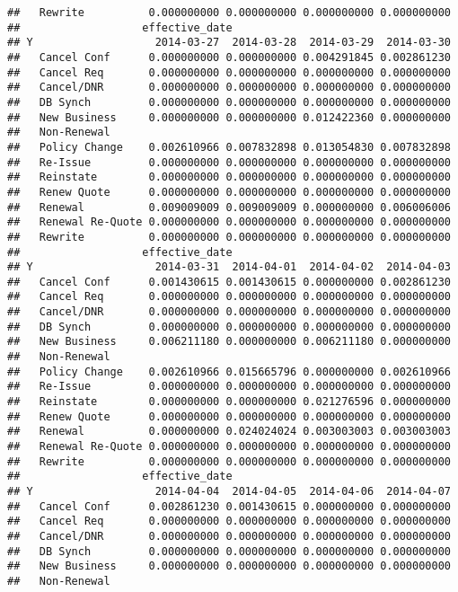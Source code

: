 \documentclass[]{article}
\begin{document}
\begin{verbatim}
##   Rewrite          0.000000000 0.000000000 0.000000000 0.000000000
##                   effective_date
## Y                   2014-03-27  2014-03-28  2014-03-29  2014-03-30
##   Cancel Conf      0.000000000 0.000000000 0.004291845 0.002861230
##   Cancel Req       0.000000000 0.000000000 0.000000000 0.000000000
##   Cancel/DNR       0.000000000 0.000000000 0.000000000 0.000000000
##   DB Synch         0.000000000 0.000000000 0.000000000 0.000000000
##   New Business     0.000000000 0.000000000 0.012422360 0.000000000
##   Non-Renewal                                                     
##   Policy Change    0.002610966 0.007832898 0.013054830 0.007832898
##   Re-Issue         0.000000000 0.000000000 0.000000000 0.000000000
##   Reinstate        0.000000000 0.000000000 0.000000000 0.000000000
##   Renew Quote      0.000000000 0.000000000 0.000000000 0.000000000
##   Renewal          0.009009009 0.009009009 0.000000000 0.006006006
##   Renewal Re-Quote 0.000000000 0.000000000 0.000000000 0.000000000
##   Rewrite          0.000000000 0.000000000 0.000000000 0.000000000
##                   effective_date
## Y                   2014-03-31  2014-04-01  2014-04-02  2014-04-03
##   Cancel Conf      0.001430615 0.001430615 0.000000000 0.002861230
##   Cancel Req       0.000000000 0.000000000 0.000000000 0.000000000
##   Cancel/DNR       0.000000000 0.000000000 0.000000000 0.000000000
##   DB Synch         0.000000000 0.000000000 0.000000000 0.000000000
##   New Business     0.006211180 0.000000000 0.006211180 0.000000000
##   Non-Renewal                                                     
##   Policy Change    0.002610966 0.015665796 0.000000000 0.002610966
##   Re-Issue         0.000000000 0.000000000 0.000000000 0.000000000
##   Reinstate        0.000000000 0.000000000 0.021276596 0.000000000
##   Renew Quote      0.000000000 0.000000000 0.000000000 0.000000000
##   Renewal          0.000000000 0.024024024 0.003003003 0.003003003
##   Renewal Re-Quote 0.000000000 0.000000000 0.000000000 0.000000000
##   Rewrite          0.000000000 0.000000000 0.000000000 0.000000000
##                   effective_date
## Y                   2014-04-04  2014-04-05  2014-04-06  2014-04-07
##   Cancel Conf      0.002861230 0.001430615 0.000000000 0.000000000
##   Cancel Req       0.000000000 0.000000000 0.000000000 0.000000000
##   Cancel/DNR       0.000000000 0.000000000 0.000000000 0.000000000
##   DB Synch         0.000000000 0.000000000 0.000000000 0.000000000
##   New Business     0.000000000 0.000000000 0.000000000 0.000000000
##   Non-Renewal                                                     

\end{verbatim}
\end{document}
